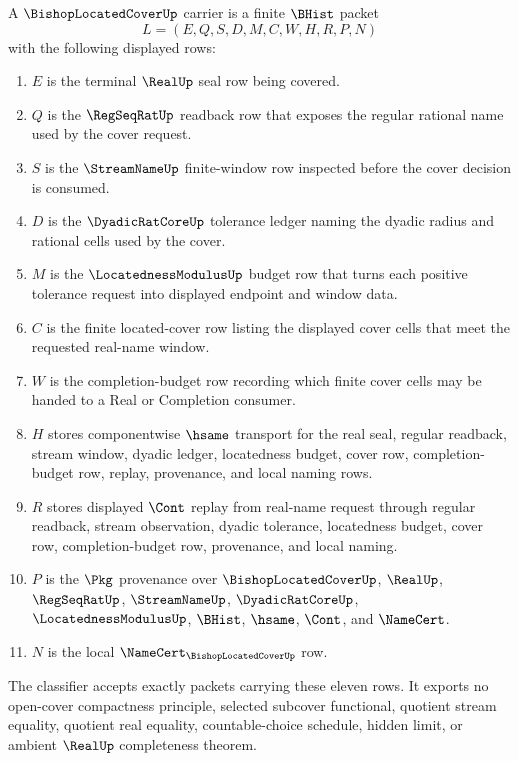 \begin{definition}
\label{def:bishop-located-cover-carrier}
A $\BishopLocatedCoverUp$ carrier is a finite $\BHist$ packet
$$
L=(E,Q,S,D,M,C,W,H,R,P,N)
$$
with the following displayed rows:
\begin{enumerate}
\item $E$ is the terminal $\RealUp$ seal row being covered.
\item $Q$ is the $\RegSeqRatUp$ readback row that exposes the regular rational name used by the cover request.
\item $S$ is the $\StreamNameUp$ finite-window row inspected before the cover decision is consumed.
\item $D$ is the $\DyadicRatCoreUp$ tolerance ledger naming the dyadic radius and rational cells used by the cover.
\item $M$ is the $\LocatednessModulusUp$ budget row that turns each positive tolerance request into displayed endpoint and window data.
\item $C$ is the finite located-cover row listing the displayed cover cells that meet the requested real-name window.
\item $W$ is the completion-budget row recording which finite cover cells may be handed to a Real or Completion consumer.
\item $H$ stores componentwise $\hsame$ transport for the real seal, regular readback, stream window, dyadic ledger, locatedness budget, cover row, completion-budget row, replay, provenance, and local naming rows.
\item $R$ stores displayed $\Cont$ replay from real-name request through regular readback, stream observation, dyadic tolerance, locatedness budget, cover row, completion-budget row, provenance, and local naming.
\item $P$ is the $\Pkg$ provenance over $\BishopLocatedCoverUp$, $\RealUp$, $\RegSeqRatUp$, $\StreamNameUp$, $\DyadicRatCoreUp$, $\LocatednessModulusUp$, $\BHist$, $\hsame$, $\Cont$, and $\NameCert$.
\item $N$ is the local $\NameCert_{\BishopLocatedCoverUp}$ row.
\end{enumerate}
The classifier accepts exactly packets carrying these eleven rows. It exports no open-cover compactness principle, selected subcover functional, quotient stream equality, quotient real equality, countable-choice schedule, hidden limit, or ambient $\RealUp$ completeness theorem.
\end{definition}

